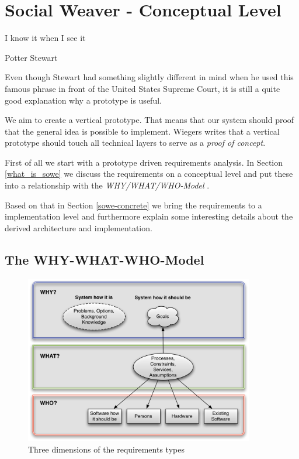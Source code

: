 \section{Social Weaver - Conceptual Level}\label{sowe-abstract}

\epigraph{I know it when I see it}{Potter Stewart}

Even though Stewart had something slightly different in mind when he used this famous phrase in front of the  United States Supreme Court, it is still a quite good explanation why a prototype is useful. 

We aim to create a vertical prototype. That means that our system should proof that the general idea is possible to implement. Wiegers writes that a vertical prototype should touch all technical layers to serve as a \emph{proof of concept}\cite{wiegers2003software}.

First of all we start with a prototype driven requirements analysis. In Section \ref{what_is_sowe}  we discuss the requirements on a conceptual level and put these into a relationship with the \emph{WHY/WHAT/WHO-Model} \cite{van2009requirements}.

Based on that in Section \ref{sowe-concrete} we bring the requirements to a implementation level and furthermore explain some interesting details about the derived architecture and implementation. 

\subsection{The WHY-WHAT-WHO-Model}\label{why-what-who}
\begin{figure}\centering
		\includegraphics[width=10cm]{images/why-what-who-model.png}
		\caption{Three dimensions of the requirements types \cite{van2009requirements}}
		\label{why-what-who-diagram}
\end{figure} 

